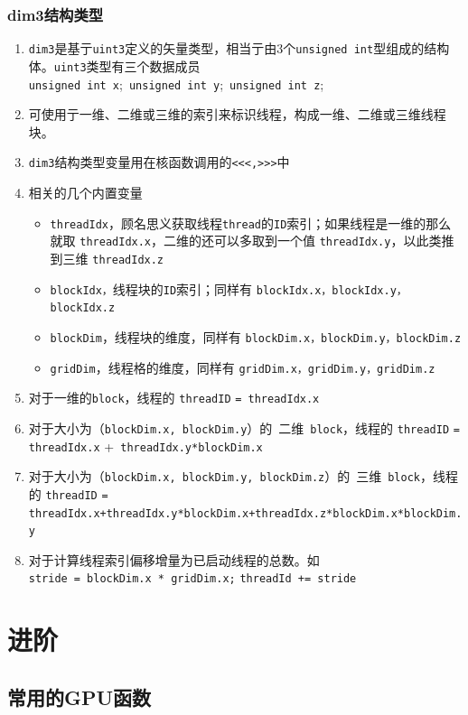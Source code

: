 \documentclass[UTF8,a4paper,12pt]{ctexbook}
\begin{document}
		\subsection{dim3结构类型}
			\begin{enumerate}
				\item \verb|dim3|是基亍\verb|uint3|定义的矢量类型，相当亍由3个\verb|unsigned int|型组成的结构体。\verb|uint3|类型有三个数据成员\verb|unsigned int x|; \verb|unsigned int y|; \verb|unsigned int z|;
				\item 可使用亍一维、二维或三维的索引来标识线程，构成一维、二维或三维线程块。
				\item \verb|dim3|结构类型变量用在核函数调用的\verb|<<<,>>>|中
				\item 相关的几个内置变量
					\begin{itemize}
						\item \verb|threadIdx|，顾名思义获取线程\verb|thread|的\verb|ID|索引；如果线程是一维的那么就取 \verb|threadIdx.x|，二维的还可以多取到一个值 \verb|threadIdx.y|，以此类推到三维 \verb|threadIdx.z|
						\item \verb|blockIdx，|线程块的\verb|ID|索引；同样有 \verb|blockIdx.x，blockIdx.y，blockIdx.z|
						\item \verb|blockDim|，线程块的维度，同样有 \verb|blockDim.x，blockDim.y，blockDim.z|
						\item \verb|gridDim|，线程格的维度，同样有 \verb|gridDim.x，gridDim.y，gridDim.z|
					\end{itemize}
				\item 对于一维的\verb|block|，线程的 \verb|threadID| \verb|= threadIdx.x|
				\item 对于大小为（\verb|blockDim.x, blockDim.y|）的 二维 \verb|block|，线程的 \verb|threadID| \verb|= threadIdx.x| +\verb| threadIdx.y*blockDim.x|
				\item 对于大小为（\verb|blockDim.x, blockDim.y, blockDim.z|）的 三维 \verb|block|，线程的 \verb|threadID| \verb|= threadIdx.x+threadIdx.y*blockDim.x+threadIdx.z*blockDim.x*blockDim.y|
				
				\item 对于计算线程索引偏移增量为已启动线程的总数。如 \verb|stride| \verb|= blockDim.x * gridDim.x;| \verb|threadId += stride|
			\end{enumerate}

\chapter{进阶}
	\section{常用的GPU函数}
\end{document}
